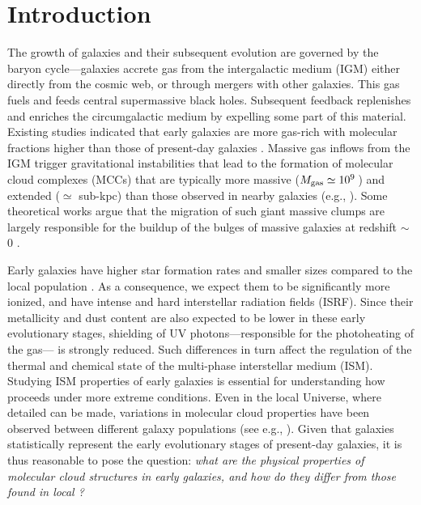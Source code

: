 \IfFileExists{emulateapjlegacy.cls}{\documentclass[iop]{emulateapjlegacy}}{\documentclass[iop]{emulateapj}}
\newcommand{\DL}[1]{({\bf \color{dlcolor} DL: #1})}
\newcommand{\MM}[1]{({\bf \color{mmcolor} MM: #1})}
\begin{document}
\section{Introduction}
The growth of galaxies and their subsequent evolution are governed by the baryon cycle---galaxies accrete gas from the intergalactic medium (IGM) either directly from the cosmic web, or through mergers with other galaxies. This gas fuels \SF and feeds central
supermassive black holes. Subsequent feedback replenishes and enriches the circumgalactic medium by expelling some
part of this material.
Existing studies indicated that early galaxies are more gas-rich with molecular fractions higher than
those of present-day galaxies \citep[e.g.,][]{vandevoort11b, Decarli16a, Decarli17a}. 
Massive gas inflows from the IGM trigger gravitational instabilities that lead to the formation of molecular cloud complexes (MCCs)
that are typically more massive ($M_{\rm gas}\simeq 10^9$\,\Msun) and extended ($\simeq$ sub-kpc) than those observed in nearby galaxies (e.g., \citealt{Gabor13a, Hopkins14a, Inoue16a}).
Some theoretical works argue that the migration of such giant massive clumps are largely responsible for the buildup of the bulges of massive galaxies at redshift \z$\sim$\,0 \citep[e.g.,][]{Ceverino10a}.

Early galaxies have higher star formation rates \citep[SFR; ][]{Behroozi13b, Sparre15a, Maiolino15a, Dunlop17a} and smaller sizes \citep[e.g.,][]{Bouwens11a, Ono13a} compared to the local population \citep[see also a review by][]{Stark16a}.
%
As a consequence, we expect them to be significantly more ionized, and have intense and hard interstellar radiation fields (ISRF). Since their metallicity and dust content are also expected to be lower in these early evolutionary stages, shielding of UV photons---responsible for the photoheating of the gas---  is strongly reduced. Such differences in turn affect the regulation of the thermal and chemical state of the multi-phase interstellar medium (ISM). Studying ISM properties of early galaxies is essential for understanding how \SF proceeds under more extreme conditions.
%
Even in the local Universe, where detailed \obs can be made, variations in molecular cloud
properties have been observed between different galaxy populations (see e.g., \citealt{Hughes10a, Hughes13b}).  Given that \highz galaxies statistically represent the early evolutionary stages of present-day galaxies, it is thus reasonable to pose the question: 
{\it what are the physical properties of
molecular cloud structures in early galaxies, and how do they differ from those found in local \galpop? }
%
\end{document}
